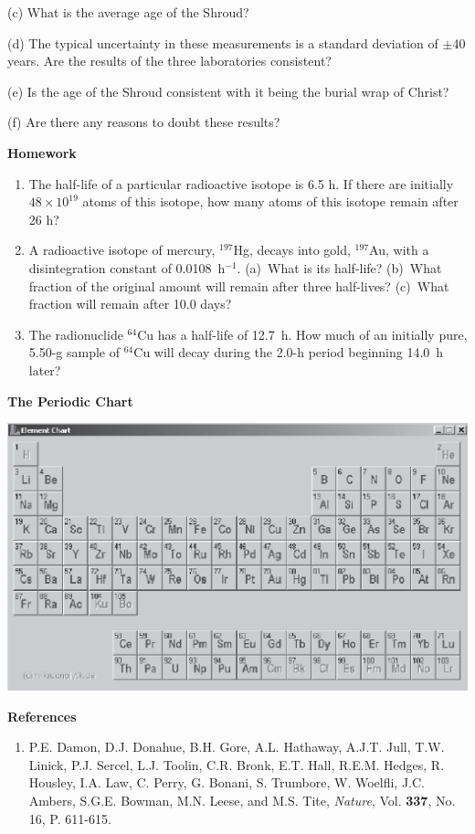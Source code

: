 \answerspace{3.5in}
(c) What is the average age of the Shroud? 
\answerspace{1in}

(d) The typical uncertainty in these measurements is a standard deviation
of \( \pm  \)40 years. Are the results of the three laboratories
consistent? 
\answerspace{1in}

\pagebreak
(e) Is the age of the Shroud consistent with it being the burial wrap
of Christ? 
\vspace{1in}

(f) Are there any reasons to doubt these results?
\vspace{1in}

\textbf{Homework} 

\begin{enumerate}
\item The half-life of a particular radioactive isotope is 6.5 h. If there
are initially $48 \times 10^{19}$ atoms of this isotope, how many
atoms of this isotope remain after 26 h? 
\item A radioactive isotope of mercury, \( ^{197} \)Hg, decays into gold,
\( ^{197} \)Au, with a disintegration constant of 0.0108~h\( ^{-1} \).
(a)~What is its half-life? (b)~What fraction of the original amount
will remain after three half-lives? (c)~What fraction will remain
after 10.0 days?
\item The radionuclide \( ^{64} \)Cu has a half-life of 12.7~h. How much
of an initially pure, 5.50-g sample of \( ^{64} \)Cu will decay during
the 2.0-h period beginning 14.0~h later? 
\end{enumerate}

\textbf{The Periodic Chart} 

\begin{center}
\includegraphics[width=5.5in]{radiocarbon_dating/pertable3_bw.eps}
\end{center}

\textbf{References}

\begin{enumerate}
\item P.E. Damon, D.J. Donahue, B.H. Gore, A.L. Hathaway, A.J.T. Jull, T.W. Linick,
P.J. Sercel, L.J. Toolin, C.R. Bronk, E.T. Hall, R.E.M. Hedges, R. Housley,
I.A. Law, C. Perry, G. Bonani, S. Trumbore, W. Woelfli, J.C. Ambers, S.G.E. Bowman,
M.N. Leese, and M.S. Tite, \emph{Nature}, Vol. \textbf{337}, No. 16,
P. 611-615.\end{enumerate}

